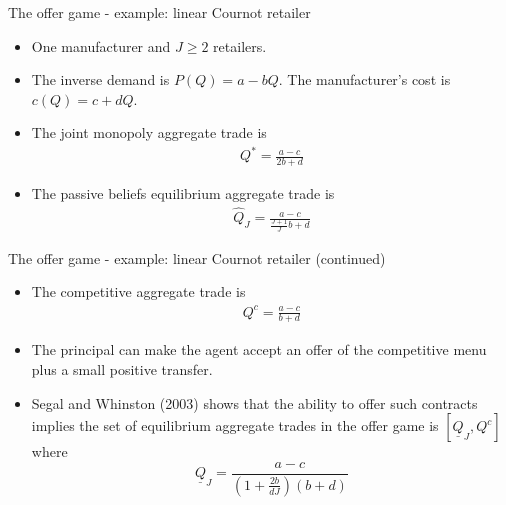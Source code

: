 \documentclass[aspectratio=169]{beamer}  %
\begin{document}
\begin{frame}{The offer game - example: linear Cournot retailer}
    \begin{itemize}
        \item One manufacturer and $J\geq2$ retailers. \vspace{.2cm}
        \item The inverse demand is $P(Q) = a - bQ$. The manufacturer's cost is $c(Q) = c + dQ$. \vspace{.2cm}
        \item The joint monopoly aggregate trade is 
        \begin{align}
            Q^* = \frac{a-c}{2b+d}
        \end{align}
        \item The passive beliefs equilibrium aggregate trade is
        \begin{align}
            \hat{Q}_J = \frac{a-c}{\frac{J+1}{J}b+d}
        \end{align}
    \end{itemize}
\end{frame}


\begin{frame}{The offer game - example: linear Cournot retailer (continued)}
    \begin{itemize}
        \item The competitive aggregate trade is
        \begin{align}
            Q^c = \frac{a-c}{b+d}
        \end{align}
        \item The principal can make the agent accept an offer of the competitive menu plus a small positive transfer. \vspace{.2cm}
        \item Segal and Whinston (2003) shows that the ability to offer such contracts implies the set of equilibrium aggregate trades in the offer game is $[\underline{Q}_J,Q^c]$ where 
        $$\underline{Q}_J = \frac{a-c}{(1+\frac{2b}{dJ})(b+d)}$$ 
    \end{itemize}

\end{frame}
\end{document}
